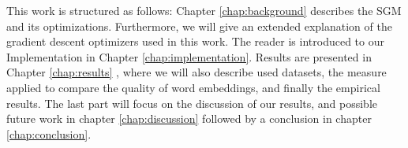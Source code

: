 This work is structured as follows: Chapter \ref{chap:background}  describes the SGM and its optimizations. Furthermore, we will give an extended explanation of the gradient descent optimizers used in this work. The reader is introduced to our Implementation in Chapter \ref{chap:implementation}. Results are presented in  Chapter \ref{chap:results} , where we will also describe used datasets, the measure applied to compare the quality of word embeddings, and finally the empirical results. The last part will focus on the discussion of our results, and possible future work in chapter \ref{chap:discussion} followed by a conclusion in chapter \ref{chap:conclusion}.














